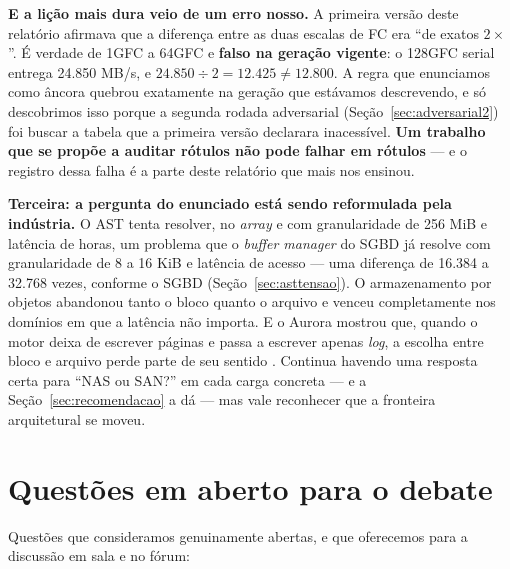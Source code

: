 \documentclass[11pt,a4paper]{article}
\begin{document}
\smallskip
\textbf{E a lição mais dura veio de um erro nosso.} A primeira versão deste relatório afirmava que a
diferença entre as duas escalas de FC era ``de exatos $2\times$''. É verdade de 1GFC a 64GFC e
\textbf{falso na geração vigente}: o 128GFC serial entrega 24.850 MB/s, e $24.850 \div 2 = 12.425
\neq 12.800$. A regra que enunciamos como âncora quebrou exatamente na geração que estávamos
descrevendo, e só descobrimos isso porque a segunda rodada adversarial (Seção~\ref{sec:adversarial2})
foi buscar a tabela que a primeira versão declarara inacessível. \textbf{Um trabalho que se propõe a
auditar rótulos não pode falhar em rótulos} --- e o registro dessa falha é a parte deste relatório
que mais nos ensinou.

\textbf{Terceira: a pergunta do enunciado está sendo reformulada pela indústria.} O AST tenta
resolver, no \textit{array} e com granularidade de 256 MiB e latência de horas, um problema que o
\textit{buffer manager} do SGBD já resolve com granularidade de 8 a 16 KiB e latência de acesso ---
uma diferença de 16.384 a 32.768 vezes, conforme o SGBD (Seção~\ref{sec:asttensao}). O armazenamento por objetos abandonou tanto o bloco quanto o arquivo e
venceu completamente nos domínios em que a latência não importa. E o Aurora mostrou que, quando o
motor deixa de escrever páginas e passa a escrever apenas \textit{log}, a escolha entre bloco e
arquivo perde parte de seu sentido \cite{aurora2017}. Continua havendo uma resposta certa para
``NAS ou SAN?'' em cada carga concreta --- e a Seção~\ref{sec:recomendacao} a dá --- mas vale
reconhecer que a fronteira arquitetural se moveu.

\section{Questões em aberto para o debate}

Questões que consideramos genuinamente abertas, e que oferecemos para a discussão em sala e no
fórum:
\end{document}
